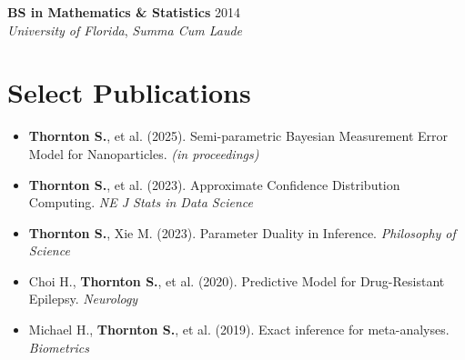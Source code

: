 \documentclass[10pt]{article}
\begin{document}
\noindent\textbf{BS in Mathematics \& Statistics} \hfill 2014 \\
\textit{University of Florida}, \textit{Summa Cum Laude} 

\vspace{-1mm}
\section*{Select Publications}
\begin{itemize}[leftmargin=*,topsep=2pt,itemsep=1pt]
    \item \textbf{Thornton S.}, et al. (2025). Semi-parametric Bayesian Measurement Error Model for Nanoparticles. \textit{(in proceedings)}
    \item \textbf{Thornton S.}, et al. (2023). Approximate Confidence Distribution Computing. \textit{NE J Stats in Data Science}
    \item \textbf{Thornton S.}, Xie M. (2023). Parameter Duality in Inference. \textit{Philosophy of Science}
    \item Choi H., \textbf{Thornton S.}, et al. (2020). Predictive Model for Drug-Resistant Epilepsy. \textit{Neurology}
    \item Michael H., \textbf{Thornton S.}, et al. (2019). Exact inference for meta-analyses. \textit{Biometrics}
\end{itemize}

\end{document}
